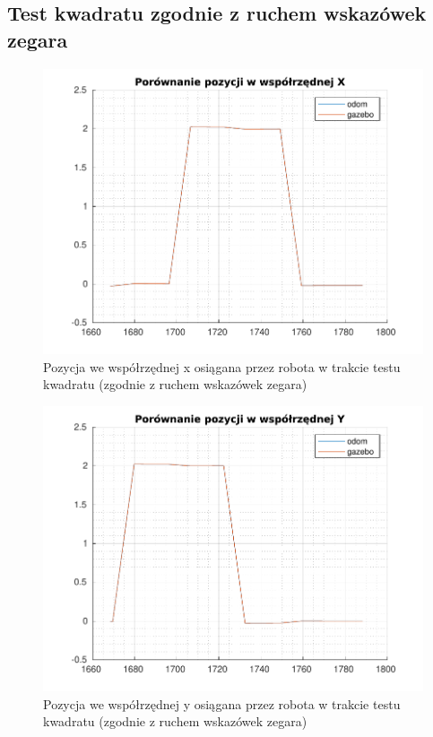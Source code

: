 \documentclass{mwrep}
\begin{document}
\subsection{Test kwadratu zgodnie z ruchem wskazówek zegara}
\begin{figure}[H]
	\centering
	\includegraphics[scale=0.8]{./figures/lab1/lab1xcw.pdf}
	\caption{Pozycja we współrzędnej x osiągana przez robota w trakcie testu kwadratu (zgodnie z ruchem wskazówek zegara)}
\end{figure}

\begin{figure}[H]
	\centering
	\includegraphics[scale=0.8]{./figures/lab1/lab1ycw.pdf}
	\caption{Pozycja we współrzędnej y osiągana przez robota w trakcie testu kwadratu (zgodnie z ruchem wskazówek zegara)}
\end{figure}
\newpage
\end{document}
